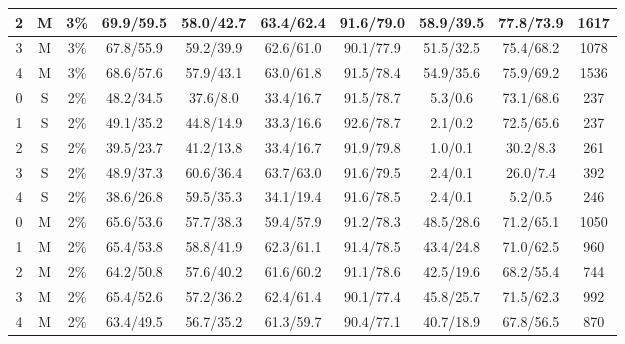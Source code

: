 \begin{table*}
\begin{tabular}{|c|c|c||c|c|c|c|c|c||c|}
2 & M & 3\% & 69.9/59.5 & 58.0/42.7 & 63.4/62.4 & 91.6/79.0 & 58.9/39.5 & 77.8/73.9 & 1617 \\ \hline
3 & M & 3\% & 67.8/55.9 & 59.2/39.9 & 62.6/61.0 & 90.1/77.9 & 51.5/32.5 & 75.4/68.2 & 1078 \\ \hline
4 & M & 3\% & 68.6/57.6 & 57.9/43.1 & 63.0/61.8 & 91.5/78.4 & 54.9/35.6 & 75.9/69.2 & 1536 \\ \hline
0 & S & 2\% & 48.2/34.5 & 37.6/8.0 & 33.4/16.7 & 91.5/78.7 & 5.3/0.6 & 73.1/68.6 & 237 \\ \hline
1 & S & 2\% & 49.1/35.2 & 44.8/14.9 & 33.3/16.6 & 92.6/78.7 & 2.1/0.2 & 72.5/65.6 & 237 \\ \hline
2 & S & 2\% & 39.5/23.7 & 41.2/13.8 & 33.4/16.7 & 91.9/79.8 & 1.0/0.1 & 30.2/8.3 & 261 \\ \hline
3 & S & 2\% & 48.9/37.3 & 60.6/36.4 & 63.7/63.0 & 91.6/79.5 & 2.4/0.1 & 26.0/7.4 & 392 \\ \hline
4 & S & 2\% & 38.6/26.8 & 59.5/35.3 & 34.1/19.4 & 91.6/78.5 & 2.4/0.1 & 5.2/0.5 & 246 \\ \hline
0 & M & 2\% & 65.6/53.6 & 57.7/38.3 & 59.4/57.9 & 91.2/78.3 & 48.5/28.6 & 71.2/65.1 & 1050 \\ \hline
1 & M & 2\% & 65.4/53.8 & 58.8/41.9 & 62.3/61.1 & 91.4/78.5 & 43.4/24.8 & 71.0/62.5 & 960 \\ \hline
2 & M & 2\% & 64.2/50.8 & 57.6/40.2 & 61.6/60.2 & 91.1/78.6 & 42.5/19.6 & 68.2/55.4 & 744 \\ \hline
3 & M & 2\% & 65.4/52.6 & 57.2/36.2 & 62.4/61.4 & 90.1/77.4 & 45.8/25.7 & 71.5/62.3 & 992 \\ \hline
4 & M & 2\% & 63.4/49.5 & 56.7/35.2 & 61.3/59.7 & 90.4/77.1 & 40.7/18.9 & 67.8/56.5 & 870 \\ \hline
\end{tabular}
\end{table*}


